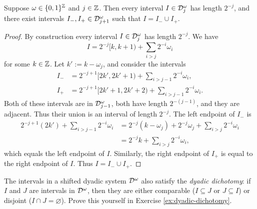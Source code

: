 \begin{prop}\label{prop:dyadicsystems}
  Suppose $\omega \in \{0,1\}^{\mathbb{Z}}$ and $j \in \mathbb{Z}$.
  Then every interval $I \in \mathcal{D}_{j}^{\omega}$ has length $2^{-j}$, and there exist intervals $I_{-}, I_{+} \in \mathcal{D}^{\omega}_{j+1}$ such that $I = I_{-} \cup I_{+}$.
\end{prop}

\begin{proof}
  By construction every interval $I \in \mathcal{D}_{j}^{\omega}$ has length $2^{-j}$.
  We have
  \begin{equation*}
    I = 2^{-j}[k,k+1) + \sum_{i > j} 2^{-i} \omega_{i}
  \end{equation*}
  for some $k \in \mathbb{Z}$.
  Let $k' := k - \omega_{j}$, and consider the intervals
  \begin{equation*}
    \begin{aligned}
      I_{-} &= 2^{-{j+1}}[2k', 2k'+1) + \sum_{i > j-1} 2^{-i} \omega_{i}, \\
      I_{+} &= 2^{-{j+1}}[2k'+1, 2k'+2) + \sum_{i > j-1} 2^{-i} \omega_{i}. 
    \end{aligned}
  \end{equation*}
  Both of these intervals are in $\mathcal{D}^{\omega}_{j-1}$, both have length $2^{-(j-1)}$, and they are adjacent.
  Thus their union is an interval of length $2^{-j}$.
  The left endpoint of $I_{-}$ is
  \begin{equation*}
    \begin{aligned}
    2^{-j+1}(2k') + \sum_{i > j-1} 2^{-i} \omega_{i}
    &= 2^{-j}(k - \omega_{j}) + 2^{-j} \omega_{j} + \sum_{i > j} 2^{-i} \omega_{i} \\
    &= 2^{-j}k + \sum_{i > j} 2^{-i} \omega_{i},
  \end{aligned}
  \end{equation*}
  which equals the left endpoint of $I$.
  Similarly, the right endpoint of $I_{+}$ is equal to the right endpoint of $I$.
  Thus $I = I_{-} \cup I_{+}$.
\end{proof}

\begin{rmk}\label{rmk:dyadic-dichotomy}
The intervals in a shifted dyadic system $\mathcal{D}^{\omega}$ also satisfy the \emph{dyadic dichotomy}: if $I$ and $J$ are intervals in $\mathcal{D}^{\omega}$, then they are either comparable ($I \subseteq J$ or $J \subseteq I$) or disjoint ($I \cap J = \varnothing$).
Prove this yourself in Exercise \ref{ex:dyadic-dichotomy}.
\end{rmk}

